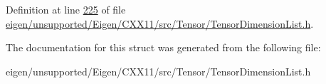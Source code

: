Definition at line \hyperlink{eigen_2unsupported_2_eigen_2_c_x_x11_2src_2_tensor_2_tensor_dimension_list_8h_source_l00225}{225} of file \hyperlink{eigen_2unsupported_2_eigen_2_c_x_x11_2src_2_tensor_2_tensor_dimension_list_8h_source}{eigen/unsupported/\+Eigen/\+C\+X\+X11/src/\+Tensor/\+Tensor\+Dimension\+List.\+h}.



The documentation for this struct was generated from the following file\+:\begin{DoxyCompactItemize}
\item 
eigen/unsupported/\+Eigen/\+C\+X\+X11/src/\+Tensor/\+Tensor\+Dimension\+List.\+h\end{DoxyCompactItemize}
